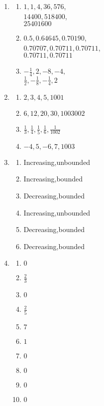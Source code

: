\documentclass[11pt,a4paper,titlepage,oneside,openany]{article}
\numberwithin{equation}{section}
\numberwithin{algorithm}{section}
\numberwithin{figure}{section}
\numberwithin{table}{section}
\begin{document}
\begin{enumerate}
\item 
  \begin{multicols}{3}
    \begin{enumerate} 
      \item $1,1,4,36,576$,\\$14400,518400$,\\$25401600$
        \columnbreak
      \item $0.5,0.64645,0.70190$,\\$0.70707,0.70711,0.70711$,\\$0.70711,0.70711$
        \columnbreak
      \item $-\frac{1}{4},2,-8,-4,$\\$\frac{1}{2},-\frac{1}{8},-\frac{1}{4},2$
    \end{enumerate}        
  \end{multicols}

\setcounter{enumi}{4}

\item 
  \begin{multicols}{2}
    \begin{enumerate} 
      \item $2,3,4,5,1001$
      \item $6,12,        20    ,    30 ,  1003002$
      \item $\frac{1}{3},\frac{1}{4},\frac{1}{5},\frac{1}{6},\frac{1}{1002}$
      \item $-4,5,-6,7,1003$
    \end{enumerate}        
  \end{multicols}

\item 
  \begin{multicols}{2}
    \begin{enumerate} 
      \item Increasing,unbounded
      \item Increasing,bounded
      \item Decreasing,bounded
      \item Increasing,unbounded
      \item Decreasing,bounded
      \item Decreasing,bounded
    \end{enumerate}        
  \end{multicols}

\item 
  \begin{multicols}{5}
    \begin{enumerate} 
      \item $0$
      \item $\frac{2}{3}$
      \item $0$
      \item $\frac{2}{5}$
      \item $7$
      \item $1$
      \item $0$
      \item $0$
      \item $0$
      \item $0$
    \end{enumerate}        
  \end{multicols}


\end{enumerate}
\end{document}
